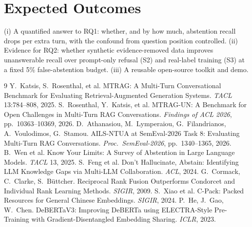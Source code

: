 \documentclass[10pt,twocolumn]{article}
\begin{document}
\section{Expected Outcomes}
(i) A quantified answer to RQ1: whether, and by how much, abstention recall drops per extra turn, with the confound from question position controlled. (ii) Evidence for RQ2: whether synthetic evidence-removed data improves unanswerable recall over prompt-only refusal (S2) and real-label training (S3) at a fixed 5\% false-abstention budget. (iii) A reusable open-source toolkit and demo.

{\footnotesize
\begin{thebibliography}{9}\setlength{\itemsep}{0pt}
 Y.~Katsis, S.~Rosenthal, et al. MTRAG: A Multi-Turn Conversational Benchmark for Evaluating Retrieval-Augmented Generation Systems. \emph{TACL} 13:784--808, 2025.
 S.~Rosenthal, Y.~Katsis, et al. MTRAG-UN: A Benchmark for Open Challenges in Multi-Turn RAG Conversations. \emph{Findings of ACL 2026}, pp.~10363--10369, 2026.
 D.~Athanasiou, M.~Lymperaiou, G.~Filandrianos, A.~Voulodimos, G.~Stamou. AILS-NTUA at SemEval-2026 Task 8: Evaluating Multi-Turn RAG Conversations. \emph{Proc.\ SemEval-2026}, pp.~1340--1365, 2026.
 B.~Wen et al. Know Your Limits: A Survey of Abstention in Large Language Models. \emph{TACL} 13, 2025.
 S.~Feng et al. Don't Hallucinate, Abstain: Identifying LLM Knowledge Gaps via Multi-LLM Collaboration. \emph{ACL}, 2024.
 G.~Cormack, C.~Clarke, S.~B\"uttcher. Reciprocal Rank Fusion Outperforms Condorcet and Individual Rank Learning Methods. \emph{SIGIR}, 2009.
 S.~Xiao et al. C-Pack: Packed Resources for General Chinese Embeddings. \emph{SIGIR}, 2024.
 P.~He, J.~Gao, W.~Chen. DeBERTaV3: Improving DeBERTa using ELECTRA-Style Pre-Training with Gradient-Disentangled Embedding Sharing. \emph{ICLR}, 2023.
\end{thebibliography}}
\end{document}
